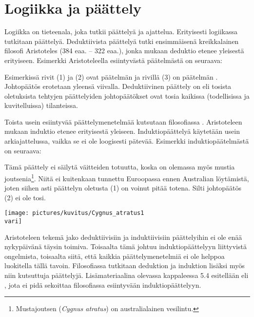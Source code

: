 \chapter{Logiikka ja päättely}

Logiikka on tieteenala, joka tutkii päättelyä ja ajattelua.
Erityisesti logiikassa tutkitaan  päättelyä.
Deduktiivista päättelyä tutki ensimmäisenä kreikkalainen filosofi Aristoteles (384 eaa. -- 322 eaa.),
jonka mukaan deduktio etenee yleisestä erityiseen.
Esimerkki Aristoteleella esiintyvästä pää\-tel\-mäs\-tä on seuraava:

\bigskip
\begin{center}
\end{center}
\bigskip

Esimerkissä rivit (1) ja (2) ovat päätelmän  ja
rivillä (3) on päätelmän .
Johtopäätös erotetaan yleensä viivalla.
Deduktiivinen päättely on  eli
tosista oletuksista tehtyjen päättelyiden johtopäätökset ovat tosia kaikissa
(todellisissa ja kuvitelluissa) tilanteissa.

Toista usein esiintyvää päättelymenetelmää kutsutaan filosofiassa
.
Aristoteleen mukaan induktio etenee erityisestä yleiseen.
Induktiopäättelyä käytetään usein arkiajattelussa, vaikka se ei
ole loogisesti pätevää.
Esimerkki induktiopäätelmästä on seuraava:

\bigskip
\begin{center}
\end{center}
\bigskip

Tämä päättely ei säilytä väitteiden totuutta, koska on olemassa myös mustia
joutsenia\footnote{Mustajoutsen ({\it Cygnus atratus}) on australialainen vesilintu.}.
Niitä ei kuitenkaan tunnettu Euroopassa ennen Australian löytämistä, joten
siihen asti päättelyn oletusta (1) on voinut pitää totena.
Silti johtopäätös (2) ei ole tosi.

\bigskip
\begin{center}
    \texttt{[image: pictures/kuvitus/Cygnus\_atratus1\\vari]}
\end{center}
\bigskip

Aristoteleen tekemä jako deduktiivisiin ja induktiivisiin päättelyihin
ei ole enää nykypäivänä täysin toimiva.
Toisaalta tämä johtuu induktiopäättelyyn liittyvistä ongelmista,
toisaalta siitä, että kaikkia päättelymenetelmiä
ei ole helppoa luokitella tällä tavoin.
Filosofiassa tutkitaan deduktion ja induktion lisäksi myös niin kutsuttuja
 päättelyjä.
Lisämateriaalina olevassa kappaleessa 5.4 esitellään
 eli
,
jota ei pidä sekoittaa filosofiassa esiintyvään induktiopäättelyyn.

